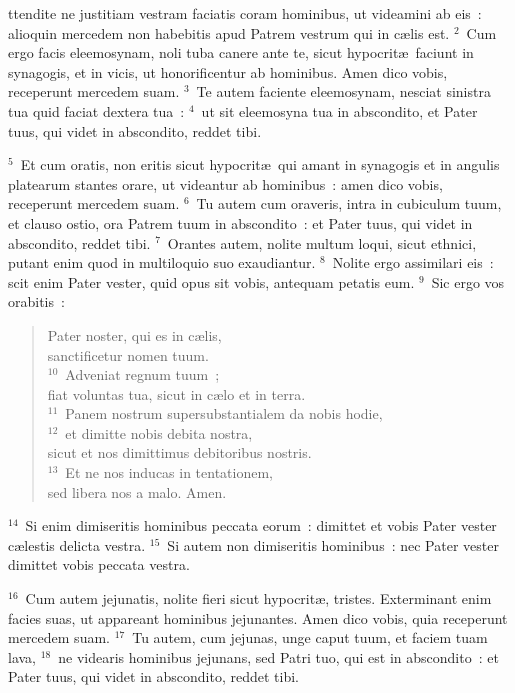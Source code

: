 \bchapter
{}ttendite ne justitiam vestram faciatis coram hominibus, ut videamini ab eis~: alioquin mercedem non habebitis apud Patrem vestrum qui in c\ae lis est.
${}^{2}$~Cum ergo facis eleemosynam, noli tuba canere ante te, sicut hypocrit\ae\ faciunt in synagogis, et in vicis, ut honorificentur ab hominibus. Amen dico vobis, receperunt mercedem suam.
${}^{3}$~Te autem faciente eleemosynam, nesciat sinistra tua quid faciat dextera tua~:
${}^{4}$~ut sit eleemosyna tua in abscondito, et Pater tuus, qui videt in abscondito, reddet tibi.


${}^{5}$~Et cum oratis, non eritis sicut hypocrit\ae\ qui amant in synagogis et in angulis platearum stantes orare, ut videantur ab hominibus~: amen dico vobis, receperunt mercedem suam.
${}^{6}$~Tu autem cum oraveris, intra in cubiculum tuum, et clauso ostio, ora Patrem tuum in abscondito~: et Pater tuus, qui videt in abscondito, reddet tibi.
${}^{7}$~Orantes autem, nolite multum loqui, sicut ethnici, putant enim quod in multiloquio suo exaudiantur.
${}^{8}$~Nolite ergo assimilari eis~: scit enim Pater vester, quid opus sit vobis, antequam petatis eum.
${}^{9}$~Sic ergo vos orabitis~: \begin{verse}Pater noster, qui es in c\ae lis,\\ sanctificetur nomen tuum.\\
${}^{10}$~Adveniat regnum tuum~;\\ fiat voluntas tua, sicut in c\ae lo et in terra.\\
${}^{11}$~Panem nostrum supersubstantialem da nobis hodie,\\
${}^{12}$~et dimitte nobis debita nostra,\\ sicut et nos dimittimus debitoribus nostris.\\
${}^{13}$~Et ne nos inducas in tentationem,\\ sed libera nos a malo. Amen.\end{verse}


${}^{14}$~Si enim dimiseritis hominibus peccata eorum~: dimittet et vobis Pater vester c\ae lestis delicta vestra.
${}^{15}$~Si autem non dimiseritis hominibus~: nec Pater vester dimittet vobis peccata vestra.


${}^{16}$~Cum autem jejunatis, nolite fieri sicut hypocrit\ae , tristes. Exterminant enim facies suas, ut appareant hominibus jejunantes. Amen dico vobis, quia receperunt mercedem suam.
${}^{17}$~Tu autem, cum jejunas, unge caput tuum, et faciem tuam lava,
${}^{18}$~ne videaris hominibus jejunans, sed Patri tuo, qui est in abscondito~: et Pater tuus, qui videt in abscondito, reddet tibi.


